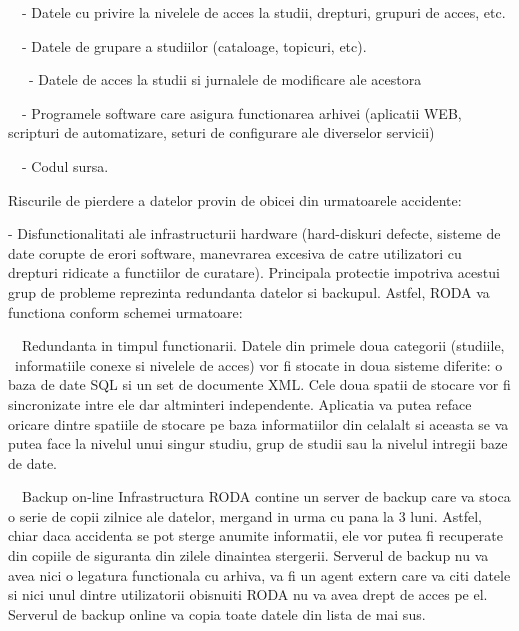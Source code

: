 {\sffamily\color{black}
\ \ {}- Datele cu privire la nivelele de acces la studii, drepturi, grupuri de acces, etc.}

{\sffamily\color{black}
\ \ {}- Datele de grupare a studiilor (cataloage, topicuri, etc).}

{\sffamily\color{black}
\ \ \ {}- Datele de acces la studii si jurnalele de modificare ale acestora}

{\sffamily\color{black}
\ \ {}- Programele software care asigura functionarea arhivei (aplicatii WEB, scripturi de automatizare, seturi de
configurare ale diverselor servicii)}

{\sffamily\color{black}
\ \ {}- Codul sursa.}


\bigskip

{\sffamily\color{black}
Riscurile de pierdere a datelor provin de obicei din urmatoarele accidente:}

{\sffamily\color{black}
{}- Disfunctionalitati ale infrastructurii hardware (hard-diskuri defecte, sisteme de date corupte de erori software,
manevrarea excesiva de catre utilizatori cu drepturi ridicate a functiilor de curatare). Principala protectie impotriva
acestui grup de probleme reprezinta redundanta datelor si backupul. Astfel, RODA va functiona conform schemei
urmatoare:}


\bigskip

{\sffamily\color{black}
\ \ Redundanta in timpul functionarii. Datele din primele doua categorii (studiile, \ informatiile conexe si nivelele de
acces) vor fi stocate in doua sisteme diferite: o baza de date SQL si un set de documente XML. Cele doua spatii de
stocare vor fi sincronizate intre ele dar altminteri independente. Aplicatia va putea reface oricare dintre spatiile de
stocare pe baza informatiilor din celalalt si aceasta se va putea face la nivelul unui singur studiu, grup de studii
sau la nivelul intregii baze de date.}

{\sffamily\color{black}
\ \ Backup on-line Infrastructura RODA contine un server de backup care va stoca o serie de copii zilnice ale datelor,
mergand in urma cu pana la 3 luni. Astfel, chiar daca accidenta se pot sterge anumite informatii, ele vor putea fi
recuperate din copiile de siguranta din zilele dinaintea stergerii. Serverul de backup nu va avea nici o legatura
functionala cu arhiva, va fi un agent extern care va citi datele si nici unul dintre utilizatorii obisnuiti RODA nu va
avea drept de acces pe el. Serverul de backup online va copia toate datele din lista de mai sus.}


